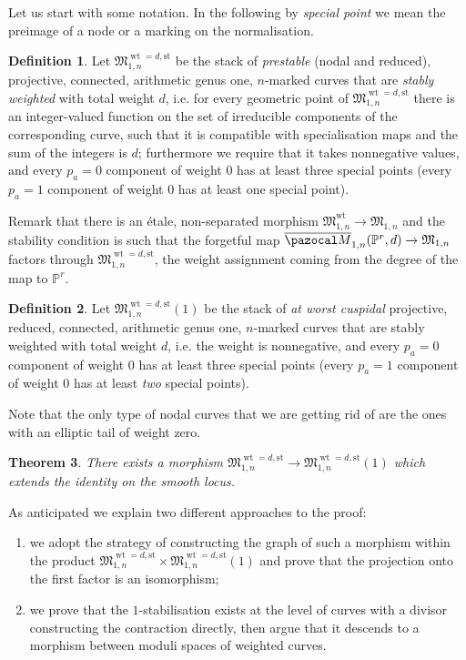 \documentclass[11pt]{amsart}
\newcommand{\M}[4]{\overline{\pazocal M}_{#1,#2}(#3,#4)}
\newcommand{\PP}{\mathbb P}
\renewcommand{\to}{\rightarrow}
\theoremstyle{plain}
\newtheorem{thm}{Theorem}[section]
\theoremstyle{definition}
\newtheorem{dfn}[thm]{Definition}
\begin{document}
Let us start with some notation. In the following by \emph{special point} we mean the preimage of a node or a marking on the normalisation.
\begin{dfn}
Let $\mathfrak M_{1,n}^{\operatorname{wt}=d,\text{st}}$ be the stack of \emph{prestable} (nodal and reduced), projective, connected, arithmetic genus one, $n$-marked curves that are \emph{stably weighted} with total weight $d$, i.e. for every geometric point of $\mathfrak M_{1,n}^{\operatorname{wt}=d,\text{st}}$ there is an integer-valued function on the set of irreducible components of the corresponding curve, such that it is compatible with specialisation maps and the sum of the integers is $d$; furthermore we require that it takes nonnegative values, and every $p_a=0$ component of weight $0$ has at least three special points (every $p_a=1$ component of weight $0$ has at least one special point).
\end{dfn}
Remark that there is an \'{e}tale, non-separated morphism $\mathfrak M_{1,n}^{\operatorname{wt}}\to\mathfrak M_{1,n}$ and the stability condition is such that the forgetful map $\M{1}{n}{\PP^r}{d}\to\mathfrak M_{1,n}$ factors through $\mathfrak M_{1,n}^{\operatorname{wt}=d,\text{st}}$, the weight assignment coming from the degree of the map to $\PP^r$.

\begin{dfn}
Let $\mathfrak M_{1,n}^{\operatorname{wt}=d,\text{st}}(1)$ be the stack of \emph{at worst cuspidal} projective, reduced, connected, arithmetic genus one, $n$-marked curves that are stably weighted with total weight $d$, i.e. the weight is nonnegative, and every $p_a=0$ component of weight $0$ has at least three special points (every $p_a=1$ component  of weight $0$ has at least \emph{two} special points).
\end{dfn}

Note that the only type of nodal curves that we are getting rid of are the ones with an elliptic tail of weight zero.

\begin{thm}
There exists a morphism $\mathfrak M_{1,n}^{\operatorname{wt}=d,\text{st}}\to\mathfrak M_{1,n}^{\operatorname{wt}=d,\text{st}}(1)$ which extends the identity on the smooth locus.
\end{thm} 
As anticipated we explain two different approaches to the proof:
\begin{enumerate}
 \item we adopt the strategy of constructing the graph of such a morphism within the product $\mathfrak M_{1,n}^{\operatorname{wt}=d,\text{st}}\times\mathfrak M_{1,n}^{\operatorname{wt}=d,\text{st}}(1)$ and prove that the projection onto the first factor is an isomorphism;
\item we prove that the $1$-stabilisation exists at the level of curves with a divisor constructing the contraction directly, then argue that it descends to a morphism between moduli spaces of weighted curves.
\end{enumerate}
\end{document}
